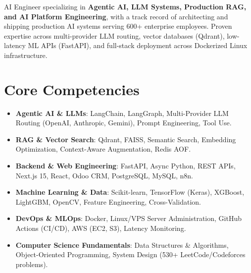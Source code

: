 \documentclass[11pt,a4paper,sans]{moderncv}
\begin{document}
\makecvtitle


\vspace{6pt}
\small{AI Engineer specializing in \textbf{Agentic AI, LLM Systems, Production RAG, and AI Platform Engineering}, with a track record of architecting and shipping production AI systems serving 600+ enterprise employees. Proven expertise across multi-provider LLM routing, vector databases (Qdrant), low-latency ML APIs (FastAPI), and full-stack deployment across Dockerized Linux infrastructure.}


\section{Core Competencies}
\vspace{1pt}
\begin{itemize}

\item \textbf{Agentic AI \& LLMs}: LangChain, LangGraph, Multi-Provider LLM Routing (OpenAI, Anthropic, Gemini), Prompt Engineering, Tool Use.

\item \textbf{RAG \& Vector Search}: Qdrant, FAISS, Semantic Search, Embedding Optimization, Context-Aware Augmentation, Redis AOF.

\item \textbf{Backend \& Web Engineering}: FastAPI, Async Python, REST APIs, Next.js 15, React, Odoo CRM, PostgreSQL, MySQL, n8n.

\item \textbf{Machine Learning \& Data}: Scikit-learn, TensorFlow (Keras), XGBoost, LightGBM, OpenCV, Feature Engineering, Cross-Validation.

\item \textbf{DevOps \& MLOps}: Docker, Linux/VPS Server Administration, GitHub Actions (CI/CD), AWS (EC2, S3), Latency Monitoring.

\item \textbf{Computer Science Fundamentals}: Data Structures \& Algorithms, Object-Oriented Programming, System Design (530+ LeetCode/Codeforces problems).

\end{itemize}
\end{document}
